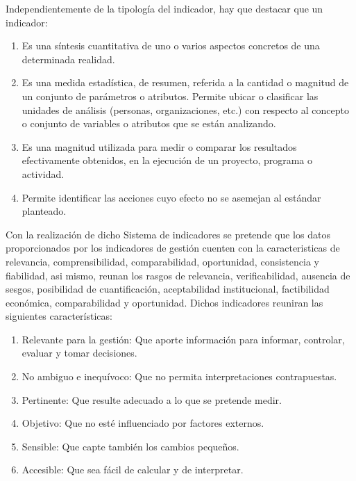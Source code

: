 	Independientemente de la tipolog\'ia del indicador, hay que destacar que un indicador:\\

	\begin{enumerate}
		\item  Es una s\'intesis cuantitativa de uno o varios aspectos concretos de una determinada realidad.
		\item  Es una medida estad\'istica, de resumen, referida a la cantidad o magnitud de un conjunto de par\'ametros o atributos. Permite ubicar o clasificar las unidades de an\'alisis (personas, organizaciones, etc.) con respecto al concepto o conjunto de variables o atributos que se est\'an analizando.
		\item  Es una magnitud utilizada para medir o comparar los resultados efectivamente obtenidos, en la ejecuci\'on de un proyecto, programa o actividad.
		\item  Permite identificar las acciones cuyo efecto no se asemejan al est\'andar planteado.
	\end{enumerate}

	Con la realizaci\'on de dicho Sistema de indicadores se pretende que los datos proporcionados por los indicadores de gesti\'on cuenten con la caracteristicas de relevancia, comprensibilidad, comparabilidad, oportunidad, consistencia y fiabilidad, asi mismo, reunan los rasgos de relevancia, verificabilidad, ausencia de sesgos, posibilidad de cuantificaci\'on, aceptabilidad institucional, factibilidad econ\'omica, comparabilidad y oportunidad. Dichos indicadores reuniran las siguientes caracter\'isticas:\\

	\begin{enumerate}
		\item  Relevante para la gesti\'on: Que aporte informaci\'on para informar, controlar, evaluar y tomar decisiones.
		\item  No ambiguo e inequ\'ivoco: Que no permita interpretaciones contrapuestas.
		\item  Pertinente: Que resulte adecuado a lo que se pretende medir.
		\item  Objetivo: Que no est\'e influenciado por factores externos.
		\item  Sensible: Que capte tambi\'en los cambios peque\~nos.
		\item  Accesible: Que sea f\'acil de calcular y de interpretar.
	\end{enumerate}

	